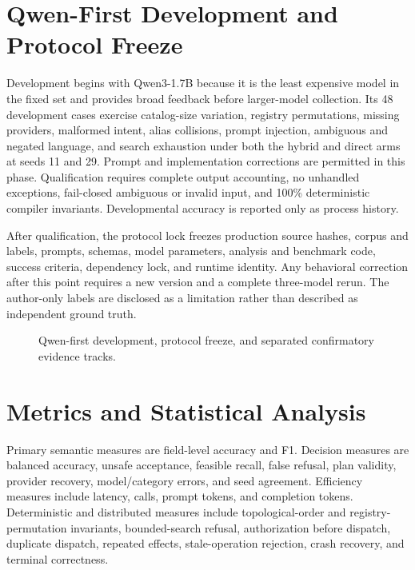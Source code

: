 \section{Qwen-First Development and Protocol Freeze}

Development begins with Qwen3-1.7B because it is the least expensive model in the fixed set and provides broad feedback before larger-model collection. Its 48 development cases exercise catalog-size variation, registry permutations, missing providers, malformed intent, alias collisions, prompt injection, ambiguous and negated language, and search exhaustion under both the hybrid and direct arms at seeds 11 and 29. Prompt and implementation corrections are permitted in this phase. Qualification requires complete output accounting, no unhandled exceptions, fail-closed ambiguous or invalid input, and 100\% deterministic compiler invariants. Developmental accuracy is reported only as process history.

After qualification, the protocol lock freezes production source hashes, corpus and labels, prompts, schemas, model parameters, analysis and benchmark code, success criteria, dependency lock, and runtime identity. Any behavioral correction after this point requires a new version and a complete three-model rerun. The author-only labels are disclosed as a limitation rather than described as independent ground truth.

\begin{figure}[htbp]
\centering
\resizebox{\textwidth}{!}{}
\caption{Qwen-first development, protocol freeze, and separated confirmatory evidence tracks.}
\label{fig:v07-evidence-pipeline}
\end{figure}

\section{Metrics and Statistical Analysis}

Primary semantic measures are field-level accuracy and F1. Decision measures are balanced accuracy, unsafe acceptance, feasible recall, false refusal, plan validity, provider recovery, model/category errors, and seed agreement. Efficiency measures include latency, calls, prompt tokens, and completion tokens. Deterministic and distributed measures include topological-order and registry-permutation invariants, bounded-search refusal, authorization before dispatch, duplicate dispatch, repeated effects, stale-operation rejection, crash recovery, and terminal correctness.

